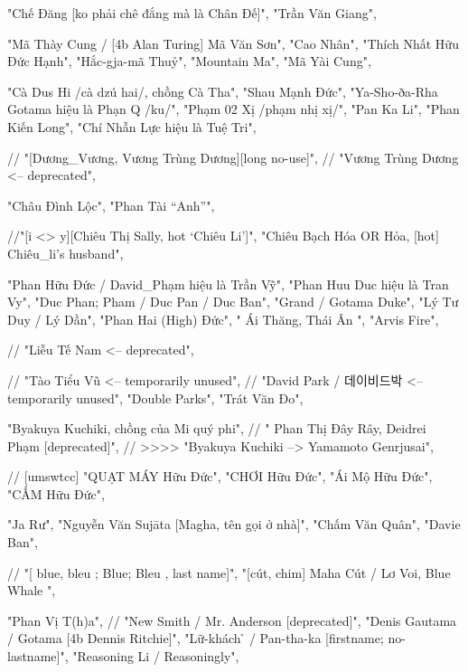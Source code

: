             "Chế Đăng [ko phải chê đắng mà là Chân Đế]",
            "Trần Văn Giang",

            "Mã Thày Cung / [4b Alan Turing] Mã Văn Sơn",
            "Cao Nhân",
            "Thích Nhất Hữu Đức Hạnh",
            "Hắc-gja-mã Thuỷ",
            "Mountain Ma",
            "Mã Yài Cung",

            "Cà Dus Hi /cà dzú hai/, chồng Cà Tha",
            "Shau Mạnh Đức",
            "Ya-Sho-ða-Rha Gotama hiệu là Phạn Q /ku/",
            "Phạm 02 Xị /phạm nhị xị/",
            "Pan Ka Li",
            "Phan Kiến Long",
            "Chí Nhẫn Lực hiệu là Tuệ Tri",

            // "[Dương_Vương, Vương Trùng Dương][long no-use]",
            // "Vương Trùng Dương <-- deprecated",

            "Châu Đình Lộc",
            "Phan Tài “Anh”",

            //"[i <> y][Chiêu Thị Sally, hot ‘Chiêu Li’]",
            "Chiêu Bạch Hóa OR Hỏa, [hot] Chiêu_li’s husband",

            "Phan Hữu Đức / David_Phạm hiệu là Trần Vỹ",
            "Phan Huu Duc hiệu là Tran Vy",
            "Duc { Phan; Pham } / Duc Pan / Duc Ban",
            "Grand / Gotama Duke",
            "Lý Tư Duy / Lý Dần",
            "Phan Hai (High) Đức",
            "{ Ái Thăng, Thái Ân }",
            "Arvis Fire",

            // "Liễu Tế Nam <-- deprecated",

            // "Tào Tiểu Vũ <-- temporarily unused",
            // "David Park / 데이비드박 <-- temporarily unused",
            "Double Parks",
            "Trát Văn Đo",

            "Byakuya Kuchiki, chồng của Mi quý phi",
            // "{ Phan Thị Đây Rây, Deidrei Phạm } [deprecated]",
            // >>>>
            "Byakuya Kuchiki --> Yamamoto Genrjusai",

            // [umswtcc]
            "QUẠT MÁY Hữu Đức",
            "CHƠI Hữu Đức",
            "Ái Mộ Hữu Đức",
            "CẤM Hữu Đức",

            "Ja Rư",
            "Nguyễn Văn Sujāta [Magha, tên gọi ở nhà]",
            "Chấm Văn Quân",
            "Davie Ban",

            // "[{ blue, bleu }; { Blue; Bleu }, last name]",
            "[cút, chim] Maha Cút / { Lơ Voi, Blue Whale }",

            "Phan Vị T(h)a",
            // "New Smith / Mr. Anderson [deprecated]",
            "Denis Gautama / Gotama [4b Dennis Ritchie]",
            "Lữ-khách ̉  / Pan-tha-ka [firstname; no-lastname]",
            "Reasoning Li / Reasoningly",

